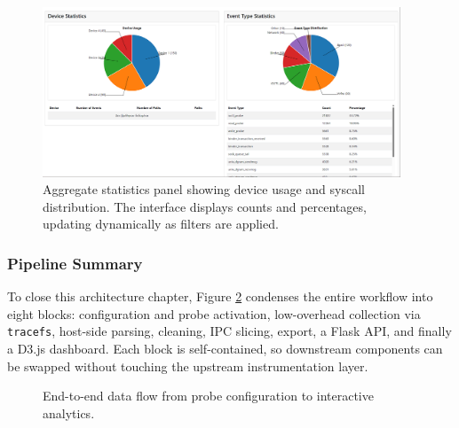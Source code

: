 \documentclass[a4paper,12pt]{report}
\begin{document}
\begin{figure}[H]
\centering
\includegraphics[width=0.95\textwidth]{device_event_statistics.png}
\caption{Aggregate statistics panel showing device usage and syscall distribution. The interface displays counts and percentages, updating dynamically as filters are applied.}
\label{fig:statistics_view}
\end{figure}

\subsubsection{Pipeline Summary}

To close this architecture chapter, Figure \ref{fig:pipeline} condenses the entire workflow into eight blocks: configuration and probe activation, low-overhead collection via \texttt{tracefs}, host-side parsing, cleaning, IPC slicing, export, a Flask API, and finally a D3.js dashboard.  Each block is self-contained, so downstream components can be swapped without touching the upstream instrumentation layer.

\begin{figure}[H]
\centering
{}
\caption{End-to-end data flow from probe configuration to interactive analytics.}
\label{fig:pipeline}
\end{figure}
\end{document}
